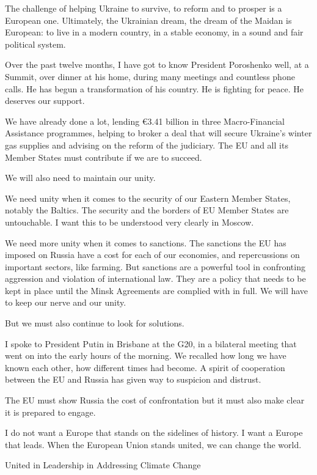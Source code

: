 \documentclass[a4paper,11pt]{article}
\begin{document}
The challenge of helping Ukraine to survive, to reform and to prosper is a European one. Ultimately, the Ukrainian dream, the dream of the Maidan is European: to live in a modern country, in a stable economy, in a sound and fair political system.

Over the past twelve months, I have got to know President Poroshenko well, at a Summit, over dinner at his home, during many meetings and countless phone calls. He has begun a transformation of his country. He is fighting for peace. He deserves our support.

We have already done a lot, lending \euro3.41 billion in three Macro-Financial Assistance programmes, helping to broker a deal that will secure Ukraine's winter gas supplies and advising on the reform of the judiciary. The EU and all its Member States must contribute if we are to succeed.

We will also need to maintain our unity.

We need unity when it comes to the security of our Eastern Member States, notably the Baltics. The security and the borders of EU Member States are untouchable. I want this to be understood very clearly in Moscow.

We need more unity when it comes to sanctions. The sanctions the EU has imposed on Russia have a cost for each of our economies, and repercussions on important sectors, like farming. But sanctions are a powerful tool in confronting aggression and violation of international law. They are a policy that needs to be kept in place until the Minsk Agreements are complied with in full. We will have to keep our nerve and our unity.

But we must also continue to look for solutions.

I spoke to President Putin in Brisbane at the G20, in a bilateral meeting that went on into the early hours of the morning. We recalled how long we have known each other, how different times had become. A spirit of cooperation between the EU and Russia has given way to suspicion and distrust.

The EU must show Russia the cost of confrontation but it must also make clear it is prepared to engage.

I do not want a Europe that stands on the sidelines of history. I want a Europe that leads. When the European Union stands united, we can change the world.

 

United in Leadership in Addressing Climate Change
\end{document}
